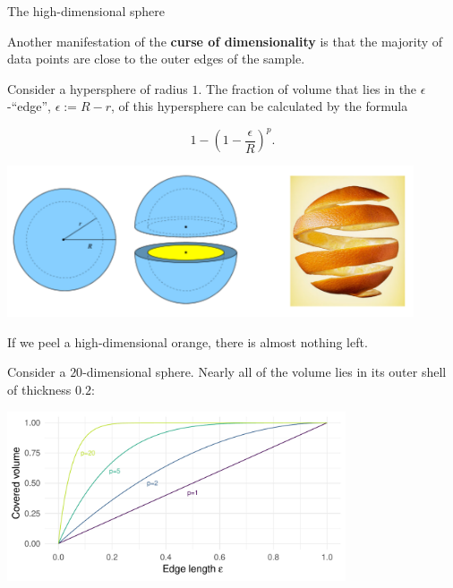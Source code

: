 \begin{vbframe}{The high-dimensional sphere}


Another manifestation of the \textbf{curse of dimensionality} is that the majority of data points are close to the outer edges of the sample.


Consider a hypersphere of radius $1$. The fraction of volume that lies in the $\epsilon$-\enquote{edge}, $\epsilon := R - r$, of this hypersphere can be calculated by the formula

\vspace*{-0.7cm}

$$
1-\left(1-\frac{\epsilon}{R}\right)^p.
$$

\vspace*{-0.5cm}

\begin{center}
\includegraphics[width=0.9\textwidth]{figure_man/orange.png}
\end{center}

\vspace*{-0.5cm}

If we peel a high-dimensional orange, there is almost nothing left.

\flushleft


\framebreak

Consider a $20$-dimensional sphere. Nearly all of the volume lies in its outer shell of thickness $0.2$:
\medskip

\vspace*{0.1cm}
\begin{center}
\includegraphics[width = 10cm ]{figure_man/cursedim-fractionedge-plot-1.pdf}
\end{center}

\end{vbframe}

